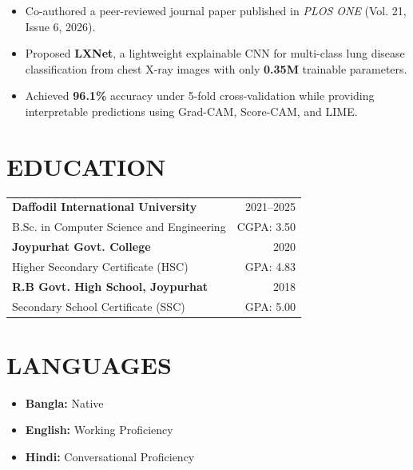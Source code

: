 \documentclass[10pt,a4paper]{article}
\begin{document}
\begin{itemize}
\item Co-authored a peer-reviewed journal paper published in \textit{PLOS ONE} (Vol. 21, Issue 6, 2026).    \item Proposed \textbf{LXNet}, a lightweight explainable CNN for multi-class lung disease classification from chest X-ray images with only \textbf{0.35M} trainable parameters.
    \item Achieved \textbf{96.1\%} accuracy under 5-fold cross-validation while providing interpretable predictions using Grad-CAM, Score-CAM, and LIME.
\end{itemize}


\section*{EDUCATION}

\begin{tabularx}{\textwidth}{Xr}
\textbf{Daffodil International University} & 2021--2025\\
\quad B.Sc. in Computer Science and Engineering & CGPA: 3.50\\[2mm]

\textbf{Joypurhat Govt. College} & 2020\\
\quad Higher Secondary Certificate (HSC) & GPA: 4.83\\[2mm]

\textbf{R.B Govt. High School, Joypurhat} & 2018\\
\quad Secondary School Certificate (SSC) & GPA: 5.00\\
\end{tabularx}

\section*{LANGUAGES}

\begin{itemize}
    \item \textbf{Bangla:} Native
    \item \textbf{English:} Working Proficiency
    \item \textbf{Hindi:} Conversational Proficiency
\end{itemize}
\end{document}
